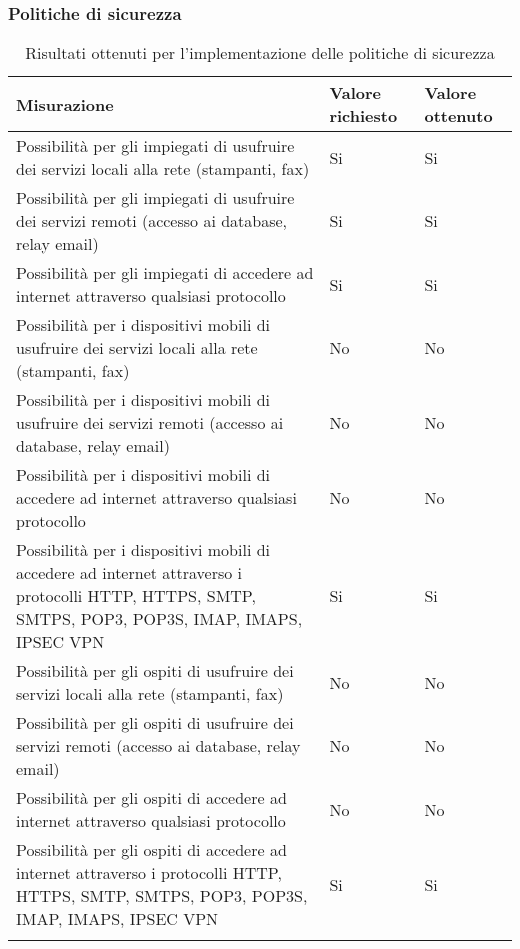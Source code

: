\documentclass[Tesi.tex]{subfiles}
\begin{document}
\subsubsection{Politiche di sicurezza}
\label{table:Risultati ottenuti per l'implementazione delle politiche di sicurezza}
\renewcommand*{\arraystretch}{1.2}
\begin{longtable}[H]{p{9.5cm}p{3.2cm}p{2cm}}
	\rowcolor{CHeader}
	\color{CHeaderText} \textbf{Misurazione} & \color{CHeaderText} \textbf{Valore richiesto} & \color{CHeaderText} \textbf{Valore ottenuto} \\
	\endhead
	Possibilità per gli impiegati di usufruire dei servizi locali alla rete (stampanti, fax) &
	Si & Si \\
	Possibilità per gli impiegati di usufruire dei servizi remoti (accesso ai database, relay email) &
	Si & Si \\
	Possibilità per gli impiegati di accedere ad internet attraverso qualsiasi protocollo &
	Si & Si \\
	Possibilità per i dispositivi mobili di usufruire dei servizi locali alla rete (stampanti, fax) &
	No & No \\
	Possibilità per i dispositivi mobili di usufruire dei servizi remoti (accesso ai database, relay email) &
	No & No \\
	Possibilità per i dispositivi mobili di accedere ad internet attraverso qualsiasi protocollo &
	No & No \\
	Possibilità per i dispositivi mobili di accedere ad internet attraverso i protocolli HTTP, HTTPS, SMTP, SMTPS, POP3, POP3S, IMAP, IMAPS, IPSEC VPN &
	Si & Si \\
	Possibilità per gli ospiti di usufruire dei servizi locali alla rete (stampanti, fax) &
	No & No \\
	Possibilità per gli ospiti di usufruire dei servizi remoti (accesso ai database, relay email) &
	No & No \\
	Possibilità per gli ospiti di accedere ad internet attraverso qualsiasi protocollo &
	No & No \\
	Possibilità per gli ospiti di accedere ad internet attraverso i protocolli HTTP, HTTPS, SMTP, SMTPS, POP3, POP3S, IMAP, IMAPS, IPSEC VPN &
	Si & Si \\
	\hiderowcolors
	\caption{Risultati ottenuti per l'implementazione delle politiche di sicurezza}
\end{longtable}
\end{document}
